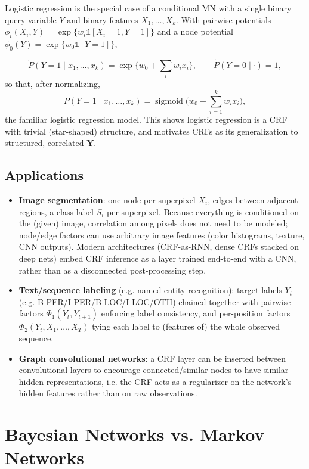 \documentclass[11pt]{article}
\begin{document}
Logistic regression is the special case of a conditional MN with a single
binary query variable $Y$ and binary features $X_1,\dots,X_k$. With
pairwise potentials $\phi_i(X_i,Y) = \exp\{w_i \mathbb{1}[X_i=1,Y=1]\}$ and a
node potential $\phi_0(Y) = \exp\{w_0\mathbb{1}[Y=1]\}$,

\[
\tilde P(Y{=}1\mid x_1,\dots,x_k) = \exp\Big\{w_0+\sum_i w_i x_i\Big\}, \qquad
\tilde P(Y{=}0\mid \cdot) = 1,
\]
so that, after normalizing,
\[
P(Y{=}1\mid x_1,\dots,x_k) = \operatorname{sigmoid}\Big(w_0+\sum_{i=1}^k w_i x_i\Big),
\]
the familiar logistic regression model. This shows logistic regression is a
CRF with trivial (star-shaped) structure, and motivates CRFs as its
generalization to structured, correlated $\mathbf{Y}$.

\subsection{Applications}

\begin{itemize}
  \item \textbf{Image segmentation}: one node per superpixel $X_i$, edges
    between adjacent regions, a class label $S_i$ per superpixel. Because
    everything is conditioned on the (given) image, correlation among
    pixels does not need to be modeled; node/edge factors can use
    arbitrary image features (color histograms, texture, CNN outputs).
    Modern architectures (CRF-as-RNN, dense CRFs stacked on deep nets)
    embed CRF inference as a layer trained end-to-end with a CNN, rather
    than as a disconnected post-processing step.
  \item \textbf{Text/sequence labeling} (e.g. named entity recognition):
    target labels $Y_t$ (e.g. B-PER/I-PER/B-LOC/I-LOC/OTH) chained together
    with pairwise factors $\Phi_1(Y_t,Y_{t+1})$ enforcing label
    consistency, and per-position factors $\Phi_2(Y_t, X_1,\dots,X_T)$
    tying each label to (features of) the whole observed sequence.
  \item \textbf{Graph convolutional networks}: a CRF layer can be inserted
    between convolutional layers to encourage connected/similar nodes to
    have similar hidden representations, i.e. the CRF acts as a
    regularizer on the network's hidden features rather than on raw
    observations.
\end{itemize}

\section{Bayesian Networks vs. Markov Networks}
\end{document}
